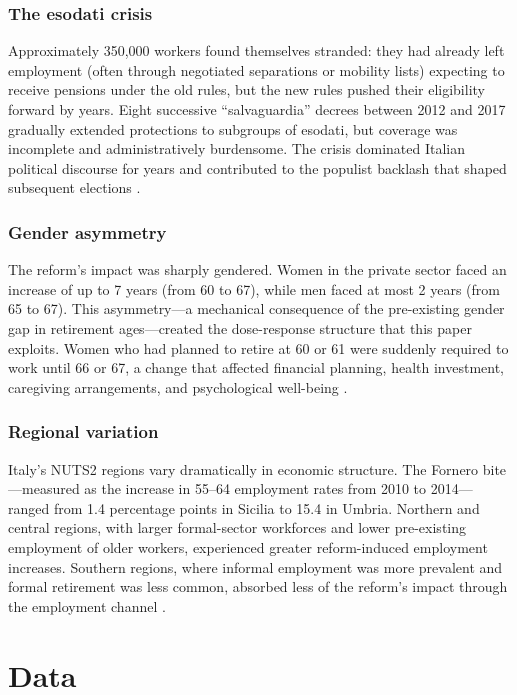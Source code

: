 \documentclass[12pt]{article}
\begin{document}
\subsubsection*{The esodati crisis} Approximately 350,000 workers found themselves stranded: they had already left employment (often through negotiated separations or mobility lists) expecting to receive pensions under the old rules, but the new rules pushed their eligibility forward by years. Eight successive ``salvaguardia'' decrees between 2012 and 2017 gradually extended protections to subgroups of esodati, but coverage was incomplete and administratively burdensome. The crisis dominated Italian political discourse for years and contributed to the populist backlash that shaped subsequent elections \citep{ferraro2020}.

\subsubsection*{Gender asymmetry} The reform's impact was sharply gendered. Women in the private sector faced an increase of up to 7 years (from 60 to 67), while men faced at most 2 years (from 65 to 67). This asymmetry---a mechanical consequence of the pre-existing gender gap in retirement ages---created the dose-response structure that this paper exploits. Women who had planned to retire at 60 or 61 were suddenly required to work until 66 or 67, a change that affected financial planning, health investment, caregiving arrangements, and psychological well-being \citep{montizaan2019, serrano2023}.

\subsubsection*{Regional variation} Italy's NUTS2 regions vary dramatically in economic structure. The Fornero bite---measured as the increase in 55--64 employment rates from 2010 to 2014---ranged from 1.4 percentage points in Sicilia to 15.4 in Umbria. Northern and central regions, with larger formal-sector workforces and lower pre-existing employment of older workers, experienced greater reform-induced employment increases. Southern regions, where informal employment was more prevalent and formal retirement was less common, absorbed less of the reform's impact through the employment channel \citep{moscarola2016}.

\section{Data}
\end{document}
